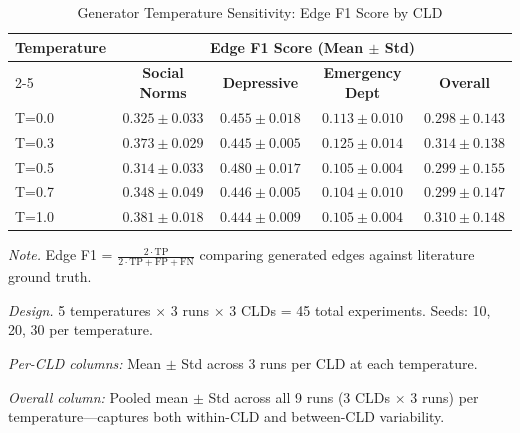 \begin{table}[H]
\centering
\caption{Generator Temperature Sensitivity: Edge F1 Score by CLD}
\label{tab:temperature_sensitivity}
\begin{threeparttable}
\begin{tabular}{lcccc}
\toprule
\textbf{Temperature} & \multicolumn{4}{c}{\textbf{Edge F1 Score (Mean $\pm$ Std)}} \\
\cmidrule(lr){2-5}
 & \textbf{Social Norms} & \textbf{Depressive} & \textbf{Emergency Dept} & \textbf{Overall} \\
\midrule
T=0.0 & $0.325 \pm 0.033$ & $0.455 \pm 0.018$ & $0.113 \pm 0.010$ & $0.298 \pm 0.143$ \\
T=0.3 & $0.373 \pm 0.029$ & $0.445 \pm 0.005$ & $0.125 \pm 0.014$ & $0.314 \pm 0.138$ \\
T=0.5 & $0.314 \pm 0.033$ & $0.480 \pm 0.017$ & $0.105 \pm 0.004$ & $0.299 \pm 0.155$ \\
T=0.7 & $0.348 \pm 0.049$ & $0.446 \pm 0.005$ & $0.104 \pm 0.010$ & $0.299 \pm 0.147$ \\
T=1.0 & $0.381 \pm 0.018$ & $0.444 \pm 0.009$ & $0.105 \pm 0.004$ & $0.310 \pm 0.148$ \\
\bottomrule
\end{tabular}
\begin{tablenotes}
\small
\item \textit{Note.} Edge F1 = $\frac{2 \cdot \text{TP}}{2 \cdot \text{TP} + \text{FP} + \text{FN}}$ comparing generated edges against literature ground truth.
\item \textit{Design.} 5 temperatures $\times$ 3 runs $\times$ 3 CLDs = 45 total experiments. Seeds: 10, 20, 30 per temperature.
\item \textit{Per-CLD columns:} Mean $\pm$ Std across 3 runs per CLD at each temperature.
\item \textit{Overall column:} Pooled mean $\pm$ Std across all 9 runs (3 CLDs $\times$ 3 runs) per temperature---captures both within-CLD and between-CLD variability.
\end{tablenotes}
\end{threeparttable}
\end{table}
